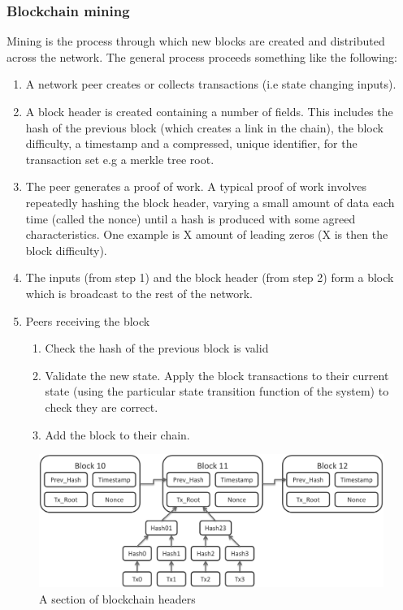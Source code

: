 \subsubsection{Blockchain mining}
Mining is the process through which new blocks are created and distributed across the network. The general process proceeds something like the following:
\begin{enumerate}

\item A network peer creates or collects transactions (i.e state changing inputs).


\item A block header is created containing a number of fields. This includes the hash of the previous block (which creates a link in the chain), the block difficulty, a timestamp and a compressed, unique identifier, for the transaction set e.g a merkle\cite{Merkle} tree root.


\item The peer generates a proof of work. A typical proof of work involves repeatedly hashing\cite{Hash} the block header, varying a small amount of data each time (called the nonce) until a hash is produced with some agreed characteristics. One example is X amount of leading zeros (X is then the block difficulty).


\item The inputs (from step 1) and the block header (from step 2) form a block which is broadcast to the rest of the network. 


\item Peers receiving the block 

\begin{enumerate}
\item Check the hash of the previous block is valid

\item Validate the new state. Apply the block transactions to their current state (using the particular state transition function of the system) to check they are correct.

\item Add the block to their chain.
\end{enumerate}
\end{enumerate}

\begin{figure}
\centering
\includegraphics[width=\textwidth]{Figures/blockchain}
\decoRule
\caption[]{A section of blockchain headers}
\label{fig:bitcoin_transition}
\end{figure}

